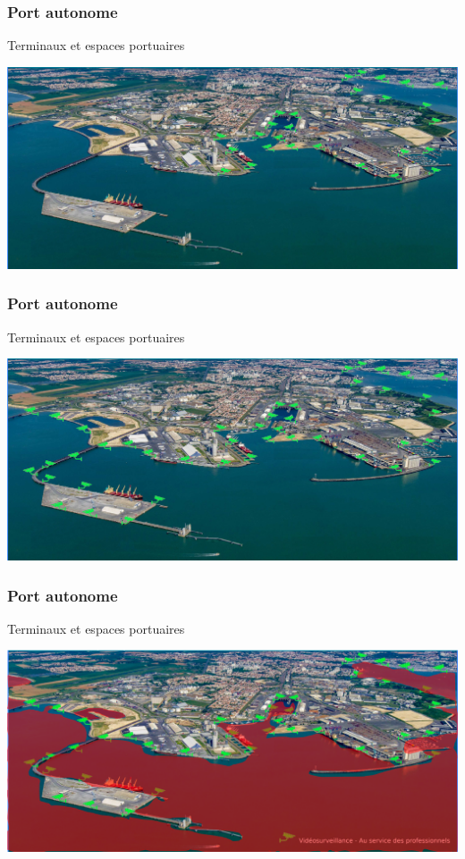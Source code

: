 \begin{frame}
	\frametitle{Port autonome}
	Terminaux et espaces portuaires
	\vspace{0.2cm}
	\begin{center}
		\includegraphics[scale=0.35]{images/terminaux_et_espaces_portuaires01.jpg}
	\end{center}
\end{frame}
\begin{frame}
	\frametitle{Port autonome}
	Terminaux et espaces portuaires
	\vspace{0.2cm}
	\begin{center}
		\includegraphics[scale=0.35]{images/terminaux_et_espaces_portuaires02.jpg}
	\end{center}
\end{frame}
\begin{frame}
	\frametitle{Port autonome}
	Terminaux et espaces portuaires
	\vspace{0.2cm}
	\begin{center}
		\includegraphics[scale=0.28]{images/terminaux_et_espaces_portuaires06.png}
	\end{center}
\end{frame}
